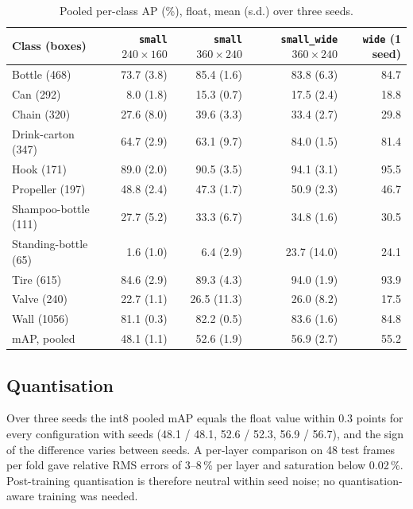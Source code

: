 \documentclass[11pt,a4paper]{article}
\newcommand{\cfg}[1]{\texttt{#1}}
\begin{document}
\begin{table}[H]
  \centering
  \small
  \caption{Pooled per-class AP (\%), float, mean (s.d.) over three seeds.}
  \label{tab:cvclass}
  \begin{tabular}{lrrrr}
    \toprule
    Class (boxes) & \cfg{small} $240{\times}160$ & \cfg{small} $360{\times}240$ & \cfg{small\_wide} $360{\times}240$ & \cfg{wide} (1 seed) \\
    \midrule
    Bottle (468) & 73.7 (3.8) & 85.4 (1.6) & 83.8 (6.3) & 84.7 \\
    Can (292) & 8.0 (1.8) & 15.3 (0.7) & 17.5 (2.4) & 18.8 \\
    Chain (320) & 27.6 (8.0) & 39.6 (3.3) & 33.4 (2.7) & 29.8 \\
    Drink-carton (347) & 64.7 (2.9) & 63.1 (9.7) & 84.0 (1.5) & 81.4 \\
    Hook (171) & 89.0 (2.0) & 90.5 (3.5) & 94.1 (3.1) & 95.5 \\
    Propeller (197) & 48.8 (2.4) & 47.3 (1.7) & 50.9 (2.3) & 46.7 \\
    Shampoo-bottle (111) & 27.7 (5.2) & 33.3 (6.7) & 34.8 (1.6) & 30.5 \\
    Standing-bottle (65) & 1.6 (1.0) & 6.4 (2.9) & 23.7 (14.0) & 24.1 \\
    Tire (615) & 84.6 (2.9) & 89.3 (4.3) & 94.0 (1.9) & 93.9 \\
    Valve (240) & 22.7 (1.1) & 26.5 (11.3) & 26.0 (8.2) & 17.5 \\
    Wall (1056) & 81.1 (0.3) & 82.2 (0.5) & 83.6 (1.6) & 84.8 \\
    \midrule
    mAP, pooled & 48.1 (1.1) & 52.6 (1.9) & 56.9 (2.7) & 55.2 \\
    \bottomrule
  \end{tabular}
\end{table}

\subsection{Quantisation}

Over three seeds the int8 pooled mAP equals the float value within 0.3
points for every configuration with seeds (48.1 / 48.1, 52.6 / 52.3,
56.9 / 56.7), and the sign of the difference varies between seeds. A
per-layer comparison on 48 test frames per fold gave relative RMS errors of
3--8\,\% per layer and saturation below 0.02\,\%. Post-training quantisation
is therefore neutral within seed noise; no quantisation-aware training was
needed.
\end{document}
